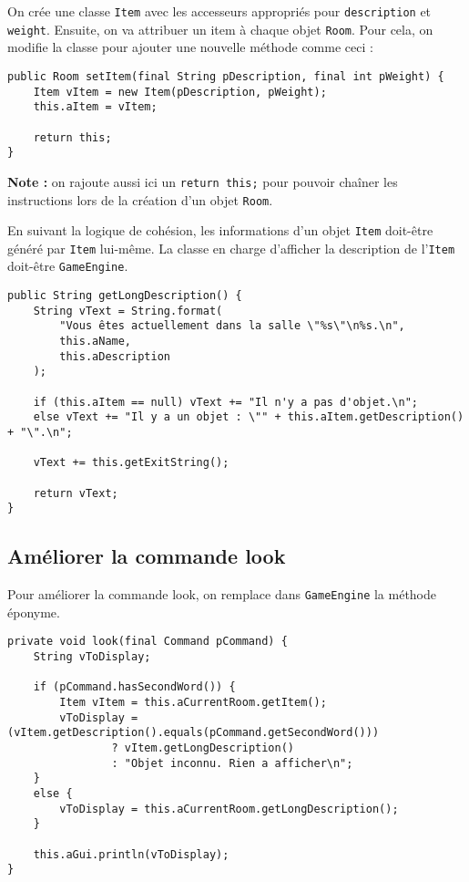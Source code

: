 \begin{exercise}[subtitle=Item]

On crée une classe \verb|Item| avec les accesseurs appropriés pour \verb|description| et \verb|weight|. Ensuite, on va attribuer un item à chaque objet \verb|Room|. Pour cela, on modifie la classe pour ajouter une nouvelle méthode comme ceci :

\begin{verbatim}
public Room setItem(final String pDescription, final int pWeight) {
    Item vItem = new Item(pDescription, pWeight);
    this.aItem = vItem;
    
    return this;
}
\end{verbatim}

\textbf{Note :} on rajoute aussi ici un \texttt{return this;} pour pouvoir chaîner les instructions lors de la création d'un objet \verb|Room|. 
\end{exercise}

\begin{exercise}[subtitle=Item description]

En suivant la logique de cohésion, les informations d'un objet \verb|Item| doit-être généré par \verb|Item| lui-même. La classe en charge d'afficher la description de l'\verb|Item| doit-être \verb|GameEngine|.

\begin{verbatim}
public String getLongDescription() {
    String vText = String.format(
        "Vous êtes actuellement dans la salle \"%s\"\n%s.\n",
        this.aName,
        this.aDescription
    );

    if (this.aItem == null) vText += "Il n'y a pas d'objet.\n";
    else vText += "Il y a un objet : \"" + this.aItem.getDescription() + "\".\n";

    vText += this.getExitString();

    return vText;
}
\end{verbatim}

\subsection*{Améliorer la commande look}

Pour améliorer la commande look, on remplace dans \verb|GameEngine| la méthode éponyme.

\begin{verbatim}
private void look(final Command pCommand) {
    String vToDisplay;

    if (pCommand.hasSecondWord()) {
        Item vItem = this.aCurrentRoom.getItem();
        vToDisplay = (vItem.getDescription().equals(pCommand.getSecondWord()))
                ? vItem.getLongDescription()
                : "Objet inconnu. Rien a afficher\n";
    }
    else {
        vToDisplay = this.aCurrentRoom.getLongDescription();
    }

    this.aGui.println(vToDisplay);
}
\end{verbatim}
\end{exercise}

